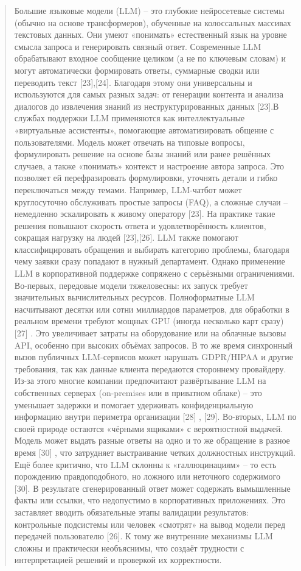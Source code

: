 \documentclass[
]{article}
\begin{document}
\begin{quote}
Большие языковые модели (LLM) -- это глубокие нейросетевые системы
(обычно на основе трансформеров), обученные на колоссальных массивах
текстовых данных. Они умеют «понимать» естественный язык на уровне
смысла запроса и генерировать связный ответ. Современные LLM
обрабатывают входное сообщение целиком (а не по ключевым словам) и могут
автоматически формировать ответы, суммарные сводки или переводить текст
{[}23{]},{[}24{]}. Благодаря этому они универсальны и используются для
самых разных задач: от генерации контента и анализа диалогов до
извлечения знаний из неструктурированных данных {[}23{]}.В службах
поддержки LLM применяются как интеллектуальные «виртуальные ассистенты»,
помогающие автоматизировать общение с пользователями. Модель может
отвечать на типовые вопросы, формулировать решение на основе базы знаний
или ранее решённых случаев, а также «понимать» контекст и настроение
автора запроса. Это позволяет ей перефразировать формулировки, уточнять
детали и гибко переключаться между темами. Например, LLM-чатбот может
круглосуточно обслуживать простые запросы (FAQ), а сложные случаи --
немедленно эскалировать к живому оператору {[}23{]}. На практике такие
решения повышают скорость ответа и удовлетворённость клиентов, сокращая
нагрузку на людей {[}23{]},{[}26{]}. LLM также помогают классифицировать
обращения и выбирать категорию проблемы, благодаря чему заявки сразу
попадают в нужный департамент. Однако применение LLM в корпоративной
поддержке сопряжено с серьёзными ограничениями. Во-первых, передовые
модели тяжеловесны: их запуск требует значительных вычислительных
ресурсов. Полноформатные LLM насчитывают десятки или сотни миллиардов
параметров, для обработки в реальном времени требуют мощных GPU (иногда
несколько карт сразу) {[}27{]} . Это увеличивает затраты на оборудование
или на облачные вызовы API, особенно при высоких объёмах запросов. В то
же время синхронный вызов публичных LLM-сервисов может нарушать
GDPR/HIPAA и другие требования, так как данные клиента передаются
стороннему провайдеру. Из-за этого многие компании предпочитают
развёртывание LLM на собственных серверах (on-premises или в приватном
облаке) -- это уменьшает задержки и помогает удерживать конфиденциальную
информацию внутри периметра организации {[}28{]} , {[}29{]}. Во-вторых,
LLM по своей природе остаются «чёрными ящиками» с вероятностной выдачей.
Модель может выдать разные ответы на одно и то же обращение в разное
время {[}30{]} , что затрудняет выстраивание четких должностных
инструкций. Ещё более критично, что LLM склонны к «галлюцинациям» -- то
есть порождению правдоподобного, но ложного или неточного содержимого
{[}30{]}. В результате сгенерированный ответ может содержать вымышленные
факты или ссылки, что недопустимо в корпоративных приложениях. Это
заставляет вводить обязательные этапы валидации результатов: контрольные
подсистемы или человек «смотрят» на вывод модели перед передачей
пользователю {[}26{]}. К тому же внутренние механизмы LLM сложны и
практически необъяснимы, что создаёт трудности с интерпретацией решений
и проверкой их корректности.


\end{quote}
\end{document}
